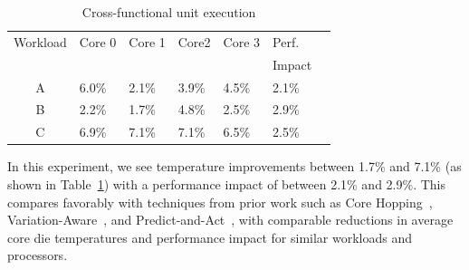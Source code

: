 \documentclass[times, 10pt,twocolumn]{IEEEtran}
\begin{document}
\begin{table}[!bp] 
\centering
  \caption{Cross-functional unit execution}
  \label{tab:mixwkload}
  \begin{tabular}{cllllll} 
\hline
Workload & Core 0 & Core 1 & Core2 & Core 3 & Perf. \\
 &  &  &  &  & Impact \\
\hline
\hline
A & 6.0\% & 2.1\% & 3.9\% & 4.5\% & 2.1\% \\
B & 2.2\% & 1.7\% & 4.8\% & 2.5\% & 2.9\% \\
C & 6.9\% & 7.1\% & 7.1\% & 6.5\% & 2.5\% \\
\hline
  \end{tabular}

\end{table} In this experiment, we see temperature improvements between
1.7\% and 7.1\% (as shown in Table~\ref{tab:mixwkload}) with a
performance impact of between 2.1\% and 2.9\%.  This compares favorably
with techniques from prior work such as Core Hopping~\cite{Choi2007},
Variation-Aware~\cite{Kursun2008}, and Predict-and-Act~\cite{Ayoub2009},
with comparable reductions in average core die temperatures and
performance impact for similar workloads and processors.
\end{document}
